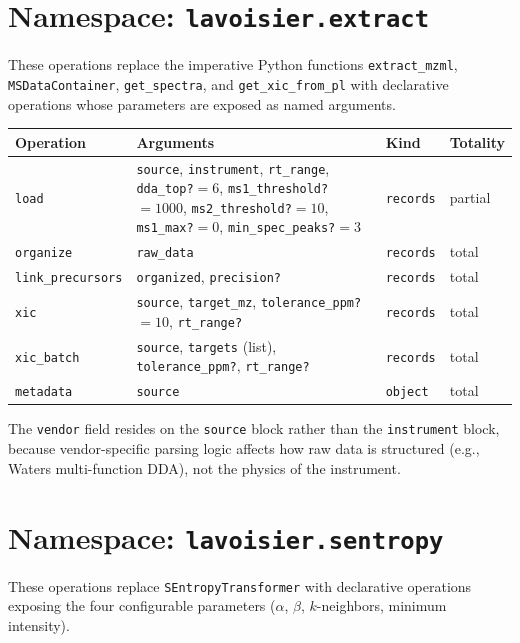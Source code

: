 \documentclass[11pt,a4paper]{article}
\theoremstyle{planstyle}
\theoremstyle{definition}
\theoremstyle{remark}
\newcommand{\shk}[1]{\texttt{#1}}
\begin{document}
\section{Namespace: \texttt{lavoisier.extract}}
\label{sec:ns-extract}

These operations replace the imperative Python functions
\shk{extract\_mzml}, \shk{MSDataContainer}, \shk{get\_spectra}, and
\shk{get\_xic\_from\_pl} with declarative operations whose parameters
are exposed as named arguments.

\begin{longtable}{@{}p{3.8cm}p{5.5cm}p{1.8cm}p{1.5cm}@{}}
\toprule
\textbf{Operation} & \textbf{Arguments} & \textbf{Kind} & \textbf{Totality} \\
\midrule
\endhead
\shk{load} &
  \shk{source}, \shk{instrument}, \shk{rt\_range}, \shk{dda\_top?}$=6$,
  \shk{ms1\_threshold?}$=1000$, \shk{ms2\_threshold?}$=10$,
  \shk{ms1\_max?}$=0$, \shk{min\_spec\_peaks?}$=3$ &
  \shk{records} & partial \\
\addlinespace
\shk{organize} & \shk{raw\_data} & \shk{records} & total \\
\shk{link\_precursors} & \shk{organized}, \shk{precision?} & \shk{records} & total \\
\shk{xic} & \shk{source}, \shk{target\_mz}, \shk{tolerance\_ppm?}$=10$,
  \shk{rt\_range?} & \shk{records} & total \\
\shk{xic\_batch} & \shk{source}, \shk{targets} (list), \shk{tolerance\_ppm?},
  \shk{rt\_range?} & \shk{records} & total \\
\shk{metadata} & \shk{source} & \shk{object} & total \\
\bottomrule
\end{longtable}

The \shk{vendor} field resides on the \shk{source} block rather than
the \shk{instrument} block, because vendor-specific parsing logic
affects how raw data is structured (e.g., Waters multi-function DDA),
not the physics of the instrument.

\section{Namespace: \texttt{lavoisier.sentropy}}
\label{sec:ns-sentropy}

These operations replace \shk{SEntropyTransformer} with declarative
operations exposing the four configurable parameters
($\alpha$, $\beta$, $k$-neighbors, minimum intensity).
\end{document}

